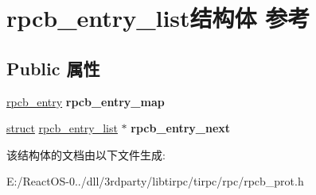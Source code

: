 \hypertarget{structrpcb__entry__list}{}\section{rpcb\+\_\+entry\+\_\+list结构体 参考}
\label{structrpcb__entry__list}
\subsection*{Public 属性}
\begin{DoxyCompactItemize}
\item 
\mbox{\label{structrpcb__entry__list_a795cc5fe3d4179a35e7c43512bbcdeca}} 
\hyperlink{structrpcb__entry}{rpcb\+\_\+entry} {\bfseries rpcb\+\_\+entry\+\_\+map}
\item 
\mbox{\label{structrpcb__entry__list_aafe14a7365868c840a5ae4c085bab762}} 
\hyperlink{interfacestruct}{struct} \hyperlink{structrpcb__entry__list}{rpcb\+\_\+entry\+\_\+list} $\ast$ {\bfseries rpcb\+\_\+entry\+\_\+next}
\end{DoxyCompactItemize}


该结构体的文档由以下文件生成\+:\begin{DoxyCompactItemize}
\item 
E\+:/\+React\+O\+S-\/0../dll/3rdparty/libtirpc/tirpc/rpc/rpcb\+\_\+prot.\+h\end{DoxyCompactItemize}
